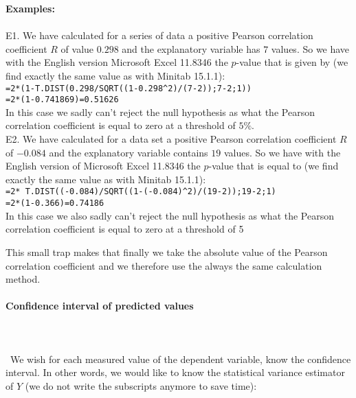 	\begin{tcolorbox}[colframe=black,colback=white,sharp corners]
	\textbf{{\Large {}}Examples:}\\\\
	E1. We have calculated for a series of data a positive Pearson correlation coefficient $R$ of value $0.298$ and the explanatory variable has $7$ values. So we have with the English version Microsoft Excel 11.8346 the $p$-value that is given by (we find exactly the same value as with Minitab 15.1.1):\\
	
	\texttt{=2*(1-T.DIST(0.298/SQRT((1-0.298\string^2)/(7-2));7-2;1))\\=2*(1-0.741869)=0.51626}\\
	
	In this case we sadly can't reject the null hypothesis as what the Pearson correlation coefficient is equal to zero at a threshold of $5\%$.\\

	E2. We have calculated for a data set a positive Pearson correlation coefficient $R$ of  $-0.084$ and the explanatory variable contains $19$ values. So we have with the English version of Microsoft Excel 11.8346 the $p$-value that is equal to (we find exactly the same value as with Minitab 15.1.1):\\
	
	\texttt{=2* T.DIST((-0.084)/SQRT((1-(-0.084)\string^2)/(19-2));19-2;1)\\=2*(1-0.366)=0.74186}\\
	
	In this case we also sadly can't reject the null hypothesis as what the Pearson correlation coefficient is equal to zero at a threshold of 5%
	\end{tcolorbox}
	This small trap makes that finally we take the absolute value of the Pearson correlation coefficient and we therefore use the always the same calculation method.
	
	
	\paragraph{Confidence interval of predicted values}\mbox{}\\\\\
	We wish for each measured value of the dependent variable, know the confidence interval. In other words, we would like to know the statistical variance estimator of $Y$ (we do not write the subscripts anymore to save time):
	
